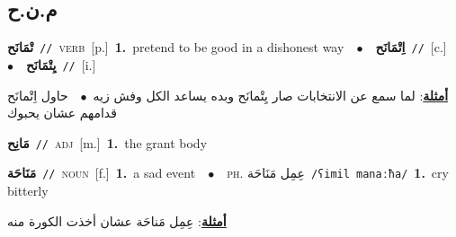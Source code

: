 \documentclass[10pt,a4paper,twoside]{article} %
\begin{document}
\begin{multicols}{2}
\vspace{-3mm}
\subsection*{\color{blue}\foreignlanguage{arabic}{م.ن.ح}\color{blue}{}} 

{\setlength\topsep{0pt}\textbf{\foreignlanguage{arabic}{تْمَانَح}}\ {\color{gray}\texttt{//}\color{black}}\ \textsc{verb}\ [p.]\ \textbf{1.}~pretend to be good in a dishonest way\ \ $\bullet$\ \ \setlength\topsep{0pt}\textbf{\foreignlanguage{arabic}{اِتْمَانَح}}\ {\color{gray}\texttt{//}\color{black}}\ [c.]\ \ $\bullet$\ \ \setlength\topsep{0pt}\textbf{\foreignlanguage{arabic}{يِتْمَانَح}}\ {\color{gray}\texttt{//}\color{black}}\ [i.]\  \begin{flushright}\color{gray}\foreignlanguage{arabic}{\textbf{\underline{\foreignlanguage{arabic}{أمثلة}}}: لما سمع عن الانتخابات صار يِتْمانَح وبده يساعد الكل وفش زيه\ $\bullet$\ \  حاول اِتْمانَح قدامهم عشان يحبوك}\end{flushright}\color{black}} \vspace{2mm}

{\setlength\topsep{0pt}\textbf{\foreignlanguage{arabic}{مَانِح}}\ {\color{gray}\texttt{//}\color{black}}\ \textsc{adj}\ [m.]\ \textbf{1.}~the grant body\ } \vspace{2mm}

{\setlength\topsep{0pt}\textbf{\foreignlanguage{arabic}{مَنَاحَة}}\ {\color{gray}\texttt{//}\color{black}}\ \textsc{noun}\ [f.]\ \textbf{1.}~a sad event\ \ $\bullet$\ \ \textsc{ph.} \color{gray} \foreignlanguage{arabic}{عِمِل مَنَاحَة}\color{black}\ {\color{gray}\texttt{/{\sffamily ʕimil manaːħa}/}\color{black}}\ \textbf{1.}~cry bitterly\  \begin{flushright}\color{gray}\foreignlanguage{arabic}{\textbf{\underline{\foreignlanguage{arabic}{أمثلة}}}: عِمِل مَناحَة عشان أخذت الكورة منه}\end{flushright}\color{black}} \vspace{2mm}


\end{multicols}
\end{document}
